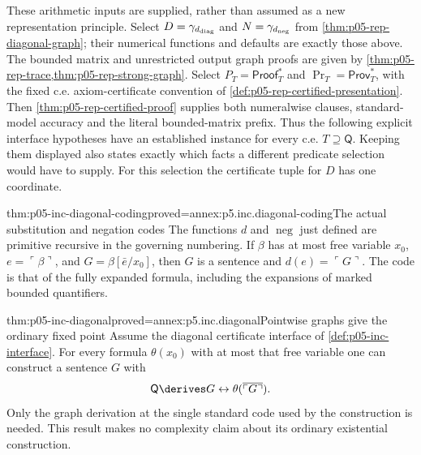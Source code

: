 These arithmetic inputs are supplied, rather than assumed as a new
representation principle. Select
\(D=\gamma_{d_{\rm diag}}\) and \(N=\gamma_{d_{\rm neg}}\)
from \cref{thm:p05-rep-diagonal-graph}; their numerical functions and
defaults are exactly those above. The bounded matrix and unrestricted
output graph proofs are given by
\cref{thm:p05-rep-trace,thm:p05-rep-strong-graph}. Select
\(P_T=\mathsf{Proof}^{*}_T\) and
\(\operatorname{Pr}_T=\mathsf{Prov}^{*}_T\), with the fixed
c.e. axiom-certificate convention of
\cref{def:p05-rep-certified-presentation}. Then
\cref{thm:p05-rep-certified-proof} supplies both numeralwise clauses,
standard-model accuracy and the literal bounded-matrix prefix. Thus the
following explicit interface hypotheses have an established instance for
every c.e. \(T\supseteq\mathsf Q\). Keeping them displayed also states
exactly which facts a different predicate selection would have to supply.
For this selection the certificate tuple for \(D\) has one coordinate.

\begin{hblemma}{thm:p05-inc-diagonal-coding}{proved=annex:p5.inc.diagonal-coding}{The actual substitution and negation codes}
The functions \(d\) and \(\operatorname{neg}\) just defined are primitive
recursive in the governing numbering. If \(\beta\) has at most free
variable \(x_0\), \(e=\ulcorner\beta\urcorner\), and
\(G=\beta[\bar e/x_0]\), then \(G\) is a sentence and
\(d(e)=\ulcorner G\urcorner\). The code is that of the fully expanded
formula, including the expansions of marked bounded quantifiers.
\end{hblemma}

\begin{hblemma}{thm:p05-inc-diagonal}{proved=annex:p5.inc.diagonal}{Pointwise graphs give the ordinary fixed point}
Assume the diagonal certificate interface of
\cref{def:p05-inc-interface}. For every formula \(\theta(x_0)\) with
at most that free variable one can construct a sentence \(G\) with
\[
 \mathsf Q\derives
 G\leftrightarrow\theta(\overline{\ulcorner G\urcorner}).
\]
Only the graph derivation at the single standard code used by the
construction is needed. This result makes no complexity claim about its
ordinary existential construction.
\end{hblemma}

